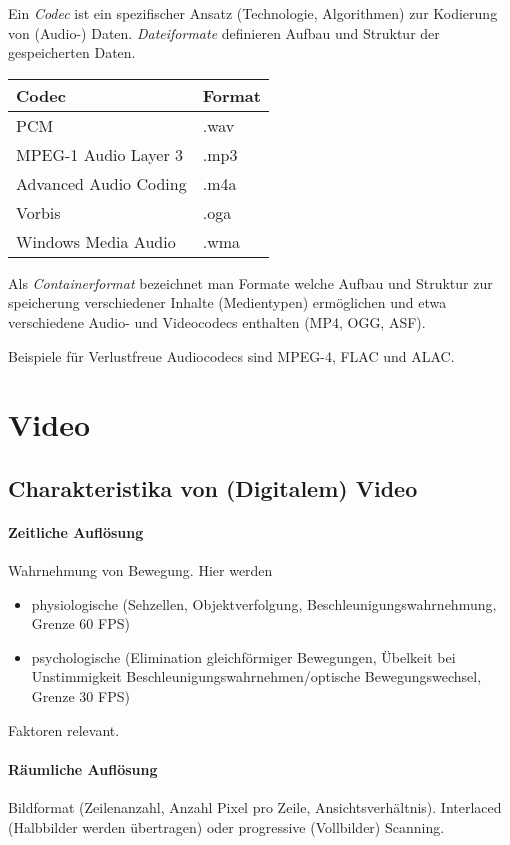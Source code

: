 \documentclass[twocolumn]{article}
\begin{document}
Ein \emph{Codec} ist ein spezifischer Ansatz (Technologie, Algorithmen) zur Kodierung von (Audio-) Daten. \emph{Dateiformate} definieren Aufbau und Struktur der gespeicherten Daten.

\begin{center}
    \begin{tabular}{l l}\toprule
        Codec & Format \\\midrule
        PCM & .wav \\
        MPEG-1 Audio Layer 3 & .mp3 \\
        Advanced Audio Coding & .m4a \\
        Vorbis & .oga \\
        Windows Media Audio & .wma \\\bottomrule
    \end{tabular}
\end{center}

Als \emph{Containerformat} bezeichnet man Formate welche Aufbau und Struktur zur speicherung verschiedener Inhalte (Medientypen) ermöglichen und etwa verschiedene Audio- und Videocodecs enthalten (MP4, OGG, ASF).

Beispiele für Verlustfreue Audiocodecs sind MPEG-4, FLAC und ALAC.

\section{Video}

\subsection{Charakteristika von (Digitalem) Video}

\paragraph{Zeitliche Auflösung} Wahrnehmung von Bewegung. Hier werden
\begin{itemize}
    \item physiologische (Sehzellen, Objektverfolgung, Beschleunigungswahrnehmung, Grenze 60 FPS)
    \item psychologische (Elimination gleichförmiger Bewegungen, Übelkeit bei Unstimmigkeit Beschleunigungswahrnehmen/optische Bewegungswechsel, Grenze 30 FPS)
\end{itemize}
Faktoren relevant.

\paragraph{Räumliche Auflösung} Bildformat (Zeilenanzahl, Anzahl Pixel pro Zeile, Ansichtsverhältnis). Interlaced (Halbbilder werden übertragen) oder progressive (Vollbilder) Scanning.
\end{document}
